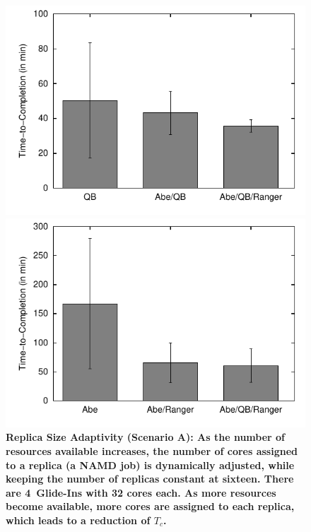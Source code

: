 \documentclass{rspublic}
\begin{document}
\begin{figure}[h]
  \begin{minipage}[t]{.48\textwidth}
    \begin{center}  
      \includegraphics[width=\textwidth]{perf_distributed_size_replica}
      \caption{\footnotesize \bf Replica Size Adaptivity (Scenario A):
        As the number of resources available increases, the number of
        cores assigned to a replica (a NAMD job) is dynamically
        adjusted, while keeping the number of replicas constant at
        sixteen.  There are 4~Glide-Ins with 32 cores each.  
        As more resources become available, more cores are
        assigned to each replica, which leads to a reduction
        of $T_{c}$.  }
      \label{fig:performance_perf_distributed_A}
    \end{center}
  \end{minipage}
  \hfill
  \begin{minipage}[t]{.485\textwidth}
    \begin{center}  
      \includegraphics[width=\textwidth]{perf_distributed_number_replica}

\end{center}
\end{minipage}
\end{figure}
\end{document}
